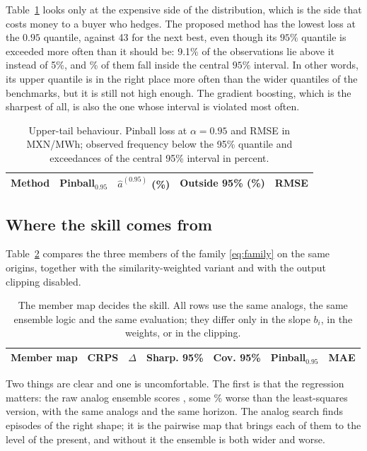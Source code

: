\documentclass[12pt,a4paper]{article}
\begin{document}
Table~\ref{tab:tail} looks only at the expensive side of the distribution,
which is the side that costs money to a buyer who hedges. The proposed method
has the lowest loss at the $0.95$ quantile, \APPINNINETYFIVE{} against
43 for the next best, even though its $95\%$ quantile is exceeded more
often than it should be: 9.1\% of the observations lie above it instead
of 5\%, and \APCOVNINETYFIVE{}\% of them fall inside the central $95\%$
interval. In other words, its upper quantile is in the right place more often
than the wider quantiles of the benchmarks, but it is still not high enough.
The gradient boosting, which is the sharpest of all, is also the one whose
interval is violated most often.

\begin{table}[htbp]
\centering
\caption{Upper-tail behaviour. Pinball loss at $\alpha=0.95$ and RMSE in
MXN/MWh; observed frequency below the 95\% quantile and exceedances of the
central 95\% interval in percent.}
\label{tab:tail}
\small
\begin{tabular}{lcccc}
\toprule
Method & Pinball$_{0.95}$ & $\hat a^{(0.95)}$ (\%) & Outside 95\% (\%) & RMSE \\
\midrule

\bottomrule
\end{tabular}
\end{table}

\subsection{Where the skill comes from}
\label{sec:ablation}

Table~\ref{tab:ablation} compares the three members of the family
\eqref{eq:family} on the same origins, together with the similarity-weighted
variant and with the output clipping disabled.

\begin{table}[htbp]
\centering
\caption{The member map decides the skill. All rows use the same analogs, the
same ensemble logic and the same evaluation; they differ only in the slope
$b_i$, in the weights, or in the clipping.}
\label{tab:ablation}
\small
\begin{tabular}{lcccccc}
\toprule
Member map & CRPS & $\Delta$ & Sharp. 95\% & Cov. 95\% & Pinball$_{0.95}$ & MAE \\
\midrule

\bottomrule
\end{tabular}
\end{table}

Two things are clear and one is uncomfortable. The first is that the
regression matters: the raw analog ensemble scores \ABANENCRPS{}, some
\ABOLSGAINANEN\% worse than the least-squares version, with the same analogs
and the same horizon. The analog search finds episodes of the right shape; it
is the pairwise map that brings each of them to the level of the present, and
without it the ensemble is both wider and worse.
\end{document}
